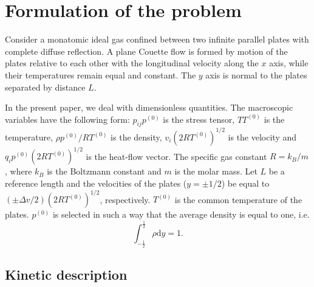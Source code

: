 \documentclass[final]{jfm} %
\newcommand{\dd}{\mathrm{d}}
\begin{document}
\section{Formulation of the problem}

Consider a monatomic ideal gas confined between two infinite parallel plates
with complete diffuse reflection.
A plane Couette flow is formed by motion of the plates relative to each other
with the longitudinal velocity along the \(x\) axis,
while their temperatures remain equal and constant.
The \(y\) axis is normal to the plates separated by distance \(L\).

In the present paper, we deal with dimensionless quantities. The macroscopic variables
have the following form: \(p_{ij}p^{(0)}\) is the stress tensor, \(TT^{(0)}\) is the temperature,
\(\rho p^{(0)}/RT^{(0)}\) is the density, \(v_i(2RT^{(0)})^{1/2}\) is the velocity
and \(q_ip^{(0)}(2RT^{(0)})^{1/2}\) is the heat-flow vector.
The specific gas constant \(R = k_B/m\), where \(k_B\) is the Boltzmann constant
and \(m\) is the molar mass.
Let \(L\) be a reference length and the velocities of the plates (\(y=\pm1/2\))
be equal to \((\pm\Delta{v}/2)(2RT^{(0)})^{1/2}\), respectively.
\(T^{(0)}\) is the common temperature of the plates.
\(p^{(0)}\) is selected in such a way that the average density is equal to one, i.e.
\begin{equation}\label{eq:total_mass}
    \int_{-\frac12}^\frac12\rho\dd{y} = 1.
\end{equation}

\subsection{Kinetic description}
\end{document}
